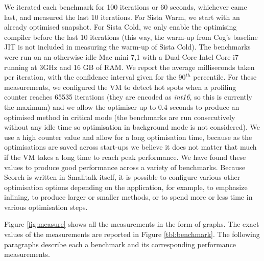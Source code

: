 \documentclass[a4paper,12pt,twoside]{../includes/ThesisStyle}
\begin{document}
We iterated each benchmark for 100 iterations or 60 seconds, whichever came last, and measured the last 10 iterations. For Sista Warm, we start with an already optimised snapshot. For Sista Cold, we only enable the optimising compiler before the last 10 iterations (this way, the warm-up from Cog's baseline JIT is not included in measuring the warm-up of Sista Cold). The benchmarks were run on an otherwise idle Mac mini 7,1 with a Dual-Core Intel Core i7 running at 3GHz and 16 GB of RAM. We report the average milliseconds taken per iteration, with the confidence interval given for the 90$^{th}$ percentile. For these measurements, we configured the VM to detect hot spots when a profiling counter reaches 65535 iterations (they are encoded as \emph{int16}, so this is currently the maximum) and we allow the optimiser up to 0.4 seconds to produce an optimised method in critical mode (the benchmarks are run consecutively without any idle time so optimisation in background mode is not considered). We use a high counter value and allow for a long optimisation time, because as the optimisations are saved across start-ups we believe it does not matter that much if the VM takes a long time to reach peak performance. We have found these values to produce good performance across a variety of benchmarks. Because Scorch is written in Smalltalk itself, it is possible to configure various other optimisation options depending on the application, for example, to emphasize inlining, to produce larger or smaller methods, or to spend more or less time in various optimisation steps. 

Figure \ref{fig:measure} shows all the measurements in the form of graphs. The exact values of the measurements are reported in Figure \ref{tbl:benchmark}. The following paragraphs describe each a benchmark and its corresponding performance measurements. 
\end{document}
